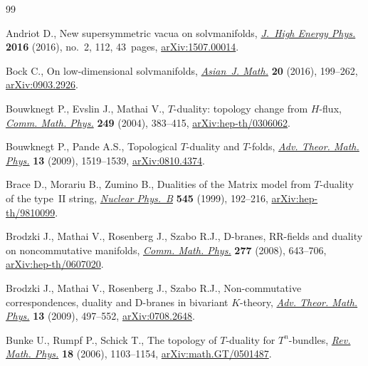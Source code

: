 \documentclass[10pt,a4paper]{amsart}
\numberwithin{equation}{section}
\begin{document}
\begin{thebibliography}{99}
\footnotesize\itemsep=0pt

Andriot D., New supersymmetric vacua on solvmanifolds, \href{https://doi.org/10.1007/JHEP02(2016)112}{\textit{J.~High Energy
 Phys.}} \textbf{2016} (2016), no.~2, 112, 43~pages, \href{https://arxiv.org/abs/1507.00014}{arXiv:1507.00014}.

Bock C., On low-dimensional solvmanifolds, \href{https://doi.org/10.4310/AJM.2016.v20.n2.a1}{\textit{Asian~J. Math.}} \textbf{20}
 (2016), 199--262, \href{https://arxiv.org/abs/0903.2926}{arXiv:0903.2926}.

Bouwknegt P., Evslin J., Mathai V., {$T$}-duality: topology change from
 {$H$}-flux, \href{https://doi.org/10.1007/s00220-004-1115-6}{\textit{Comm. Math. Phys.}} \textbf{249} (2004), 383--415,
 \href{https://arxiv.org/abs/hep-th/0306062}{arXiv:hep-th/0306062}.

Bouwknegt P., Pande A.S., Topological {$T$}-duality and {$T$}-folds,
 \href{https://doi.org/10.4310/ATMP.2009.v13.n5.a6}{\textit{Adv. Theor. Math. Phys.}} \textbf{13} (2009), 1519--1539,
 \href{https://arxiv.org/abs/0810.4374}{arXiv:0810.4374}.

Brace D., Morariu B., Zumino B., Dualities of the {M}atrix model from
 {$T$}-duality of the type~{II} string, \href{https://doi.org/10.1016/S0550-3213(99)00009-7}{\textit{Nuclear Phys.~B}} \textbf{545}
 (1999), 192--216, \href{https://arxiv.org/abs/hep-th/9810099}{arXiv:hep-th/9810099}.

Brodzki J., Mathai V., Rosenberg J., Szabo R.J., D-branes, {RR}-fields and
 duality on noncommutative manifolds, \href{https://doi.org/10.1007/s00220-007-0396-y}{\textit{Comm. Math. Phys.}} \textbf{277}
 (2008), 643--706, \href{https://arxiv.org/abs/hep-th/0607020}{arXiv:hep-th/0607020}.

Brodzki J., Mathai V., Rosenberg J., Szabo R.J., Non-commutative
 correspondences, duality and {D}-branes in bivariant {$K$}-theory,
 \href{https://doi.org/10.4310/ATMP.2009.v13.n2.a4}{\textit{Adv. Theor. Math. Phys.}} \textbf{13} (2009), 497--552,
 \href{https://arxiv.org/abs/0708.2648}{arXiv:0708.2648}.

Bunke U., Rumpf P., Schick T., The topology of {$T$}-duality for
 {$T^n$}-bundles, \href{https://doi.org/10.1142/S0129055X06002875}{\textit{Rev. Math. Phys.}} \textbf{18} (2006), 1103--1154,
 \href{https://arxiv.org/abs/math.GT/0501487}{arXiv:math.GT/0501487}.


\end{thebibliography}
\end{document}
